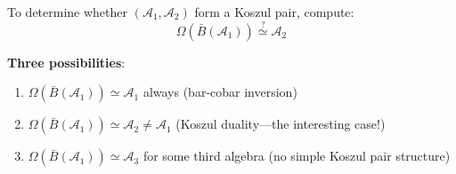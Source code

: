 \begin{remark}
\label{rem:diagnostic-koszul-test}
To determine whether $(\mathcal{A}_1, \mathcal{A}_2)$ form a Koszul pair, compute:
$$\Omega(\bar{B}(\mathcal{A}_1)) \stackrel{?}{\simeq} \mathcal{A}_2$$

\textbf{Three possibilities}:
\begin{enumerate}
\item $\Omega(\bar{B}(\mathcal{A}_1)) \simeq \mathcal{A}_1$ always (bar-cobar inversion)
\item $\Omega(\bar{B}(\mathcal{A}_1)) \simeq \mathcal{A}_2 \neq \mathcal{A}_1$ 
      (Koszul duality—the interesting case!)
\item $\Omega(\bar{B}(\mathcal{A}_1)) \simeq \mathcal{A}_3$ for some third algebra 
      (no simple Koszul pair structure)
\end{enumerate}
\end{remark}


